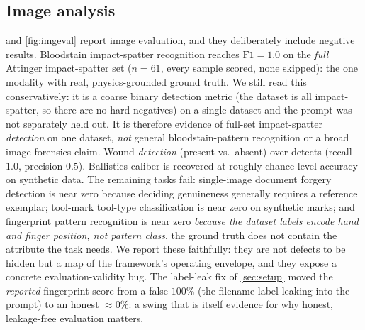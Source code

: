 \documentclass[conference]{IEEEtran}
\begin{document}
\subsection{Image analysis}
 and \cref{fig:imgeval} report image evaluation, and they
deliberately include negative results. Bloodstain impact-spatter recognition
reaches $\mathrm{F1}=1.0$ on the \emph{full} Attinger impact-spatter set
($n{=}61$, every sample scored, none skipped): the one modality with real,
physics-grounded ground truth. We still read this conservatively: it is a coarse
binary detection metric (the dataset is all impact-spatter, so there are no hard
negatives) on a single dataset and the prompt was not separately held out. It is
therefore evidence of full-set impact-spatter \emph{detection} on one dataset,
\emph{not} general bloodstain-pattern recognition or a broad image-forensics claim. Wound \emph{detection} (present vs.\ absent) over-detects
(recall $1.0$, precision $0.5$). Ballistics caliber is recovered at roughly
chance-level accuracy on synthetic data. The remaining tasks fail: single-image
document forgery detection is near zero because deciding genuineness generally
requires a reference exemplar; tool-mark tool-type classification is near zero on
synthetic marks; and fingerprint pattern recognition is near zero \emph{because
the dataset labels encode hand and finger position, not pattern class}, the
ground truth does not contain the attribute the task needs. We report these
faithfully: they are not defects to be hidden but a map of the framework's
operating envelope, and they expose a concrete evaluation-validity bug. The
label-leak fix of \cref{sec:setup} moved the \emph{reported} fingerprint score
from a false $100\%$ (the filename label leaking into the prompt) to an honest
$\approx\!0\%$: a swing that is itself evidence for why honest, leakage-free
evaluation matters.
\end{document}
